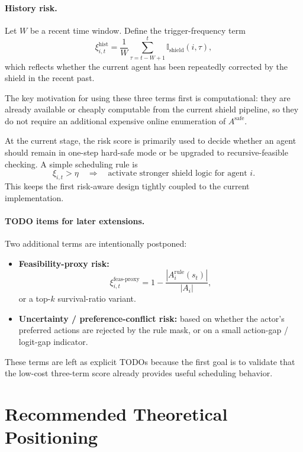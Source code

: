 \documentclass[11pt]{article}
\begin{document}
\paragraph{History risk.}
Let $W$ be a recent time window. Define the trigger-frequency term
\begin{equation}
\xi_{i,t}^{\mathrm{hist}}
=
\frac{1}{W} \sum_{\tau=t-W+1}^{t} \mathbb I_{\mathrm{shield}}(i,\tau),
\end{equation}
which reflects whether the current agent has been repeatedly corrected by the shield in the recent past.

The key motivation for using these three terms first is computational: they are already available or cheaply computable from the current shield pipeline, so they do not require an additional expensive online enumeration of $A^{\mathrm{safe}}$.

At the current stage, the risk score is primarily used to decide whether an agent should remain in one-step hard-safe mode or be upgraded to recursive-feasible checking. A simple scheduling rule is
\begin{equation}
\xi_{i,t} > \eta
\quad \Rightarrow \quad
\text{activate stronger shield logic for agent } i.
\end{equation}
This keeps the first risk-aware design tightly coupled to the current implementation.

\paragraph{TODO items for later extensions.}
Two additional terms are intentionally postponed:
\begin{itemize}[leftmargin=1.5em]
    \item \textbf{Feasibility-proxy risk:}
    \begin{equation}
    \xi_{i,t}^{\mathrm{feas\mbox{-}proxy}} = 1 - \frac{|A_i^{\mathrm{rule}}(s_t)|}{|A_i|},
    \end{equation}
    or a top-$k$ survival-ratio variant.
    \item \textbf{Uncertainty / preference-conflict risk:} based on whether the actor's preferred actions are rejected by the rule mask, or on a small action-gap / logit-gap indicator.
\end{itemize}
These terms are left as explicit TODOs because the first goal is to validate that the low-cost three-term score already provides useful scheduling behavior.

\section{Recommended Theoretical Positioning}
\end{document}
